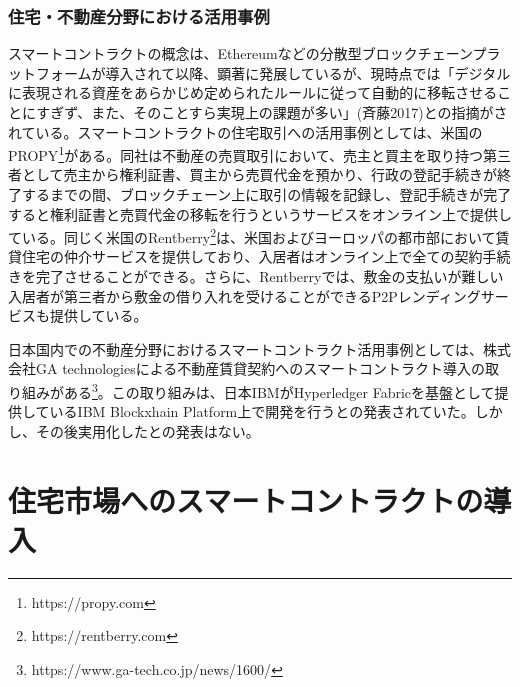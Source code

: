 \documentclass[a4paper,fontsize=11pt,report,notitlepage,line_length=38zw,number_of_lines=40,dvipdfmx]{jlreq}
\begin{document}
\subsection{住宅・不動産分野における活用事例}
スマートコントラクトの概念は、Ethereumなどの分散型ブロックチェーンプラットフォームが導入されて以降、顕著に発展しているが、現時点では「デジタルに表現される資産をあらかじめ定められたルールに従って自動的に移転させることにすぎず、また、そのことすら実現上の課題が多い」(斉藤2017)\cite{saito2017}との指摘がされている。スマートコントラクトの住宅取引への活用事例としては、米国のPROPY\footnote{https://propy.com}がある。同社は不動産の売買取引において、売主と買主を取り持つ第三者として売主から権利証書、買主から売買代金を預かり、行政の登記手続きが終了するまでの間、ブロックチェーン上に取引の情報を記録し、登記手続きが完了すると権利証書と売買代金の移転を行うというサービスをオンライン上で提供している。同じく米国のRentberry\footnote{https://rentberry.com}は、米国およびヨーロッパの都市部において賃貸住宅の仲介サービスを提供しており、入居者はオンライン上で全ての契約手続きを完了させることができる。さらに、Rentberryでは、敷金の支払いが難しい入居者が第三者から敷金の借り入れを受けることができるP2Pレンディングサービスも提供している。

日本国内での不動産分野におけるスマートコントラクト活用事例としては、株式会社GA technologiesによる不動産賃貸契約へのスマートコントラクト導入の取り組みがある\footnote{https://www.ga-tech.co.jp/news/1600/}。この取り組みは、日本IBMがHyperledger Fabricを基盤として提供しているIBM Blockxhain Platform上で開発を行うとの発表されていた。しかし、その後実用化したとの発表はない。

\chapter{住宅市場へのスマートコントラクトの導入}
\end{document}
